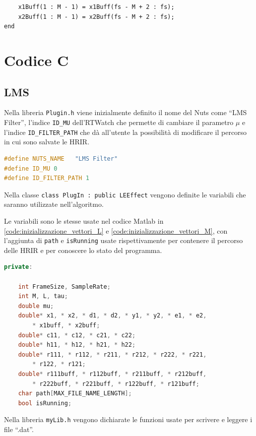 \documentclass[12pt,a4paper,titlepage]{article}
\begin{document}
\begin{lstlisting}[label=code:ols6, caption=Aggiornamento del buffer di ingresso, captionpos=b, language=matlabfloz]
    % first M - 1 values of the new vector must be the last ones of the previous array
    x1Buff(1 : M - 1) = x1Buff(fs - M + 2 : fs); 
    x2Buff(1 : M - 1) = x2Buff(fs - M + 2 : fs); 
end
\end{lstlisting}  

\clearpage

\section{Codice C}
\label{sec:codice_c}
\subsection{LMS}
\label{subsec:codice_c_lms}
Nella libreria \texttt{Plugin.h} viene inizialmente definito il nome del Nuts come ``LMS Filter'', l’indice \texttt{ID\_MU} dell'RTWatch che permette di cambiare
il parametro $\mu$ e l'indice \texttt{ID\_FILTER\_PATH} che dà all'utente la possibilità di modificare il percorso in cui sono salvate le HRIR.

\begin{lstlisting}[language=cpp, label = dichiarazione_costanti_lms, caption = Dichiarazione delle costanti in \texttt{Plugin.h}, captionpos = b]
#define NUTS_NAME	"LMS Filter"
#define ID_MU 0 
#define ID_FILTER_PATH 1
\end{lstlisting}
Nella classe \texttt{class PlugIn :	public LEEffect} vengono definite le variabili che saranno utilizzate nell'algoritmo.

Le variabili sono le stesse usate nel codice Matlab in \ref{code:inizializzazione_vettori_L} e \ref{code:inizializzazione_vettori_M}, con l'aggiunta di \texttt{path} e \texttt{isRunning} usate rispettivamente per contenere il percorso delle HRIR e per conoscere lo stato del programma.
\begin{lstlisting}[language=cpp, label=code:variabili_lms, caption = Dichiarazione delle variabili in \texttt{Plugin.h}, breaklines = false, captionpos = b]
private:

	int FrameSize, SampleRate;
	int M, L, tau;
	double mu;
	double* x1, * x2, * d1, * d2, * y1, * y2, * e1, * e2,
		* x1buff, * x2buff;
	double* c11, * c12, * c21, * c22;
	double* h11, * h12, * h21, * h22;
	double* r111, * r112, * r211, * r212, * r222, * r221, 
		* r122, * r121;
	double* r111buff, * r112buff, * r211buff, * r212buff, 
		* r222buff, * r221buff, * r122buff, * r121buff;
	char path[MAX_FILE_NAME_LENGTH];
	bool isRunning;
\end{lstlisting}
Nella libreria \texttt{myLib.h} vengono dichiarate le funzioni usate per scrivere e leggere i file ``.dat''.
\end{document}
